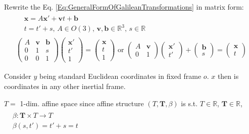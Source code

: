 \documentclass[10pt]{amsart}
\begin{document}
\begin{multicols*}{2}
Rewrite the Eq. \ref{Eq:GeneralFormOfGalileanTransformations} in matrix form:
\[
\begin{gathered}
\begin{aligned}
& \mathbf{x} = A \mathbf{x}' + \mathbf{v} t + \mathbf{b} \\ 
& t = t'+ s, \, A \in O(3), \, \mathbf{v}, \mathbf{b} \in \mathbb{R}^3, \, s \in \mathbb{R}
\end{aligned} \\
\left( \begin{matrix} A & \mathbf{v} & \mathbf{b} \\ 0 & 1 & s \\ 0 & 0 & 1 \end{matrix} \right) \left(\begin{matrix} \mathbf{x}' \\ t' \\ 1 \end{matrix} \right) = \left( \begin{matrix} \mathbf{x} \\ t  \\ 1 \end{matrix} \right) \text{ or } \left( \begin{matrix} A & \mathbf{v} \\  0 & 1 \end{matrix} \right) \left( \begin{matrix}\mathbf{x}' \\ t' \end{matrix} \right) + \left( \begin{matrix} \mathbf{b} \\ s \end{matrix} \right) = \left(\begin{matrix} \mathbf{x} \\ t \end{matrix} \right)
\end{gathered}
\]

Consider $y$ being standard Euclidean coordinates in fixed frame $o$. $x$ then is coordinates in any other inertial frame.

$T =$ 1-dim. affine space since affine structure $(T, \mathbf{T}, \beta)$ is s.t. $T\in \mathbb{R}$, $\mathbf{T} \in \mathbb{R}$, $\begin{aligned} & \quad \\ 
& \beta : \mathbf{T} \times T \to T \\
& \beta(s,t') = t' + s = t\end{aligned}$ \\


\end{multicols*}
\end{document}
